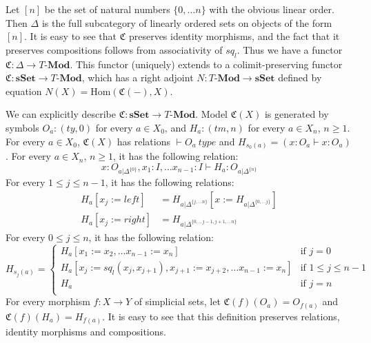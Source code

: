 \documentclass[reqno]{amsart}
\theoremstyle{definition}
\theoremstyle{remark}
\newcommand{\repl}{:=}
\newcommand{\cat}[1]{\mathbf{#1}}
\newcommand{\Mod}[1]{#1\text{-}\cat{Mod}}
\newcommand{\sSet}{\cat{sSet}}
\newcommand{\Hom}{\mathrm{Hom}}
\newcommand{\M}{H}
\numberwithin{figure}{section}
\begin{document}
Let $[n]$ be the set of natural numbers $\{ 0, \ldots n \}$ with the obvious linear order.
Then $\Delta$ is the full subcategory of linearly ordered sets on objects of the form $[n]$.
It is easy to see that $\mathfrak{C}$ preserves identity morphisms,
and the fact that it preserves compositions follows from associativity of $sq_l$.
Thus we have a functor $\mathfrak{C} : \Delta \to \Mod{T}$.
This functor (uniquely) extends to a colimit-preserving functor $\mathfrak{C} : \sSet \to \Mod{T}$,
which has a right adjoint $N : \Mod{T} \to \sSet$ defined by equation $N(X) = \Hom(\mathfrak{C}(-),X)$.

We can explicitly describe $\mathfrak{C} : \sSet \to \Mod{T}$.
Model $\mathfrak{C}(X)$ is generated by symbols $O_a : (ty,0)$ for every $a \in X_0$, and $\M_a : (tm,n)$ for every $a \in X_n$, $n \geq 1$.
For every $a \in X_0$, $\mathfrak{C}(X)$ has relations $\vdash O_a\ type$ and $\M_{s_0(a)} = (x : O_a \vdash x : O_a)$.
For every $a \in X_n$, $n \geq 1$, it has the following relation:
\[ x : O_{a|\Delta^{\{0\}}}, x_1 : I, \ldots x_{n-1} : I \vdash \M_a : O_{a|\Delta^{\{n\}}} \]
For every $1 \leq j \leq n-1$, it has the following relations:
\begin{align*}
\M_a[x_j \repl left] & = \M_{a|\Delta^{\{ j, \ldots n \}}}[x \repl \M_{a|\Delta^{\{ 0, \ldots j \}}}] \\
\M_a[x_j \repl right] & = \M_{a|\Delta^{\{0, \ldots j-1, j+1, \ldots n\}}}
\end{align*}
For every $0 \leq j \leq n$, it has the following relation:
\[ \M_{s_j(a)} =
\begin{cases}
    \M_a[x_1 \repl x_2, \ldots x_{n-1} \repl x_n]                                      & \text{if } j = 0 \\
    \M_a[x_j \repl sq_l(x_j,x_{j+1}), x_{j+1} \repl x_{j+2}, \ldots x_{n-1} \repl x_n] & \text{if } 1 \leq j \leq n-1 \\
    \M_a                                                                               & \text{if } j = n \\
\end{cases}
\]
For every morphism $f : X \to Y$ of simplicial sets, let $\mathfrak{C}(f)(O_a) = O_{f(a)}$ and $\mathfrak{C}(f)(\M_a) = \M_{f(a)}$.
It is easy to see that this definition preserves relations, identity morphisms and compositions.
\end{document}
